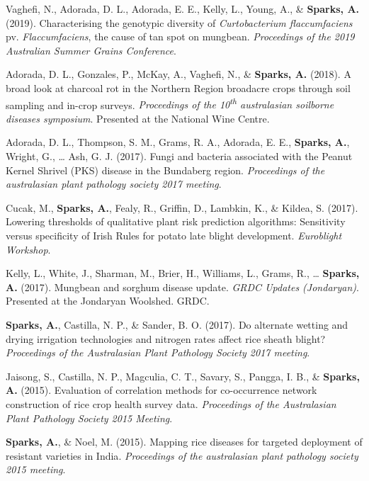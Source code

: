 \documentclass[11pt, a4paper]{awesome-cv}
\begin{document}
\leavevmode\hypertarget{ref-Vaghefi2019}{}%
Vaghefi, N., Adorada, D. L., Adorada, E. E., Kelly, L., Young, A., \&
\textbf{Sparks, A.} (2019). Characterising the genotypic diversity of
{\emph{Curtobacterium flaccumfaciens}} pv. \emph{Flaccumfaciens}, the
cause of tan spot on mungbean. \emph{Proceedings of the 2019 Australian
Summer Grains Conference}.

\leavevmode\hypertarget{ref-Adorada2018}{}%
Adorada, D. L., Gonzales, P., McKay, A., Vaghefi, N., \&
\textbf{Sparks, A.} (2018). A broad look at charcoal rot in the
{Northern Region} broadacre crops through soil sampling and in-crop
surveys. \emph{Proceedings of the 10\textsuperscript{th} australasian
soilborne diseases symposium}. Presented at the National Wine Centre.

\leavevmode\hypertarget{ref-Adorada2017}{}%
Adorada, D. L., Thompson, S. M., Grams, R. A., Adorada, E. E.,
\textbf{Sparks, A.}, Wright, G., \ldots{} Ash, G. J. (2017). Fungi and
bacteria associated with the {Peanut Kernel Shrivel (PKS)} disease in
the {Bundaberg} region. \emph{Proceedings of the australasian plant
pathology society 2017 meeting}.

\leavevmode\hypertarget{ref-Cucak2017}{}%
Cucak, M., \textbf{Sparks, A.}, Fealy, R., Griffin, D., Lambkin, K., \&
Kildea, S. (2017). Lowering thresholds of qualitative plant risk
prediction algorithms: Sensitivity versus specificity of {Irish Rules}
for potato late blight development. \emph{Euroblight Workshop}.

\leavevmode\hypertarget{ref-Kelly2017}{}%
Kelly, L., White, J., Sharman, M., Brier, H., Williams, L., Grams, R.,
\ldots{} \textbf{Sparks, A.} (2017). Mungbean and sorghum disease
update. \emph{GRDC Updates (Jondaryan)}. Presented at the Jondaryan
Woolshed. GRDC.

\leavevmode\hypertarget{ref-Sparks2017b}{}%
\textbf{Sparks, A.}, Castilla, N. P., \& Sander, B. O. (2017). Do
alternate wetting and drying irrigation technologies and nitrogen rates
affect rice sheath blight? \emph{Proceedings of the {Australasian Plant
Pathology Society} 2017 meeting}.

\leavevmode\hypertarget{ref-Jaisong2015}{}%
Jaisong, S., Castilla, N. P., Magculia, C. T., Savary, S., Pangga, I.
B., \& \textbf{Sparks, A.} (2015). Evaluation of correlation methods for
co-occurrence network construction of rice crop health survey data.
\emph{Proceedings of the Australasian Plant Pathology Society 2015
Meeting}.

\leavevmode\hypertarget{ref-Sparks2015}{}%
\textbf{Sparks, A.}, \& Noel, M. (2015). Mapping rice diseases for
targeted deployment of resistant varieties in {India}. \emph{Proceedings
of the australasian plant pathology society 2015 meeting}.
\end{document}
